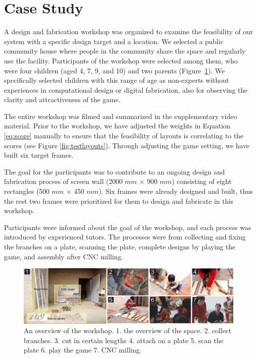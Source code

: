 \section{Case Study}
\label{sec:casestudy}
A design and fabrication workshop was organized to examine the feasibility of our system with a specific design target and a location.
We selected a public community house where people in the community share the space and regularly use the facility.
Participants of the workshop were selected among them, who were four children (aged 4, 7, 9, and 10) and two parents (Figure~\ref{fig:workshop}).
We specifically selected children with this range of age as non-experts without experiences in computational design or digital fabrication, also for observing the clarity and attractiveness of the game.

The entire workshop was filmed and summarized in the supplementary video material.
Prior to the workshop, we have adjusted the weights in Equation \ref{eq:score} manually to ensure that the feasibility of layouts is correlating to the scores (see Figure \ref{fig:testlayouts}). 
Through adjusting the game setting, we have built six target frames.

The goal for the participants was to contribute to an ongoing design and fabrication process of screen wall (2000 $mm$ $\times$ 900 $mm$) consisting of eight rectangles (500 $mm$ $\times$ 450 $mm$).
Six frames were already designed and built, thus the rest two frames were prioritized for them to design and fabricate in this workshop.

Participants were informed about the goal of the workshop, and each process was introduced by experienced tutors.
The processes were from collecting and fixing the branches on a plate, scanning the plate, complete designs by playing the game, and assembly after CNC milling.

\begin{figure}[ht]
  \begin{center}
    \includegraphics[width = 0.4\paperwidth]{images/fabrication/workshop_setup.png}
    \caption{An overview of the workshop. 1. the overview of the space. 2. collect branches. 3. cut in certain lengths 4. attach on a plate 5. scan the plate 6. play the game 7. CNC milling.}
    \label{fig:workshop}
  \end{center}
\end{figure}

